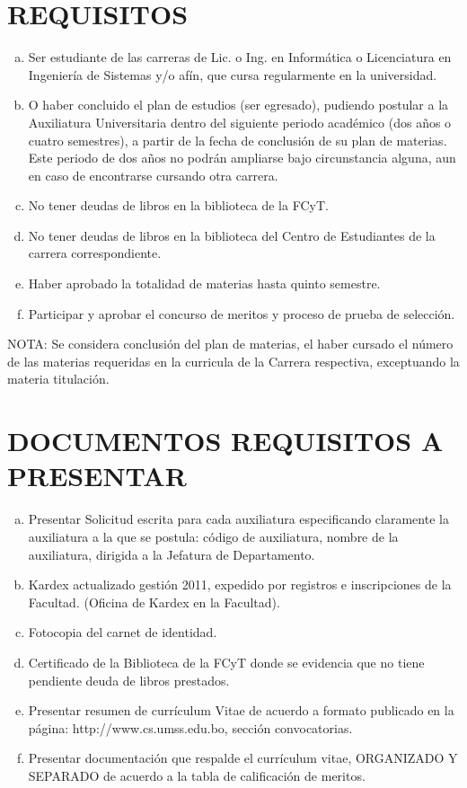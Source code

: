 \documentclass[letterpaper,11pt]{article}
\begin{document}
\section{REQUISITOS}
\begin{enumerate}[a)]
\item Ser estudiante de las carreras de Lic. o Ing. en Informática o Licenciatura en Ingeniería de Sistemas y/o afín, que cursa regularmente en la universidad.
\item O haber concluido el plan de estudios (ser egresado), pudiendo postular a la Auxiliatura Universitaria dentro del siguiente periodo académico (dos años o cuatro semestres), a partir de la fecha de conclusión de su plan de materias. Este periodo de dos años no podrán ampliarse bajo circunstancia alguna, aun en caso de encontrarse cursando otra carrera.
\item No tener deudas de libros en la biblioteca de la FCyT.
\item No tener deudas de libros en la biblioteca del Centro de Estudiantes de la carrera correspondiente.
\item Haber aprobado la totalidad de materias hasta quinto semestre.
\item Participar y aprobar el concurso de meritos y proceso de prueba de selección.
\end{enumerate}

NOTA: Se considera conclusión del plan de materias, el haber cursado el número de las materias requeridas en la curricula de la Carrera respectiva, exceptuando la materia titulación.

\section{DOCUMENTOS REQUISITOS A PRESENTAR}
\begin{enumerate}[a)]
\item Presentar Solicitud escrita para cada auxiliatura especificando claramente la auxiliatura a la que se postula: código de auxiliatura, nombre de la auxiliatura, dirigida a la Jefatura de Departamento.
\item Kardex actualizado gestión 2011, expedido por registros e inscripciones de la Facultad. (Oficina de Kardex en la Facultad).
\item Fotocopia del carnet de identidad.
\item Certificado de la Biblioteca de la FCyT donde se evidencia que no tiene pendiente deuda de libros prestados.
\item Presentar resumen de currículum Vitae de acuerdo a formato publicado en la página: http://www.cs.umss.edu.bo, sección convocatorias.
\item Presentar documentación que respalde el currículum vitae, ORGANIZADO Y SEPARADO de acuerdo a la tabla de calificación de meritos.
\end{enumerate}
\end{document}
